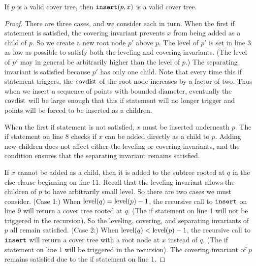 \documentclass[../main.tex]{subfiles}
\newcommand{\mkfunction}[1]{\ifmmode{\text{{#1}}}}
\newcommand{\level}[1]      {\mkfunction{level}({#1})}
\newcommand{\ctinsert}{\ensuremath{\textnormal{\ttfamily insert}}}
\begin{document}
{\begin{theorem}
If $p$ is a valid cover tree, then $\ctinsert(p,x)$ is a valid cover tree.
\end{theorem}

\begin{proof}
    There are three cases, and we consider each in turn.
    When the first if statement is satisfied, 
    the covering invariant prevents $x$ from being added as a child of $p$.
    So we create a new root node $p'$ above $p$.
    The level of $p'$ is set in line 3 as low as possible to satisfy both the leveling and covering invariants.
    (The level of $p'$ may in general be arbitrarily higher than the level of $p$.)
    The separating invariant is satisfied because $p'$ has only one child.
    Note that every time this if statement triggers,
    the $\mkfunction{covdist}$ of the root node increases by a factor of two.
    Thus when we insert a sequence of points with bounded diameter, 
    eventually the $\mkfunction{covdist}$ will be large enough that this if statement will no longer trigger and points will be forced to be inserted as a children.

    When the first if statement is not satisfied, 
    $x$ must be inserted underneath $p$.
    The if statement on line 8 checks if $x$ can be added directly as a child to $p$.
    Adding new children does not affect either the leveling or covering invariants,
    and the condition ensures that the separating invariant remains satisfied.

    If $x$ cannot be added as a child, 
    then it is added to the subtree rooted at $q$ in the else clause beginning on line 11.
    Recall that the leveling invariant allows the children of $p$ to have arbitrarily small level.
    So there are two cases we must consider.
    (Case 1:) When $\level{q}=\level{p}-1$, 
    the recursive call to $\ctinsert$ on line 9 will return a cover tree rooted at $q$.
    (The if statement on line 1 will not be triggered in the recursion).
    So the leveling, covering, and separating invariants of $p$ all remain satisfied.
    (Case 2:) When $\level{q}<\level{p}-1$, 
    the recursive call to $\ctinsert$ will return a cover tree with a root node at $x$ instead of $q$.
    (The if statement on line 1 will be triggered in the recursion).
    The covering invariant of $p$ remains satisfied due to the if statement on line 1.
\end{proof}

}
\end{document}
